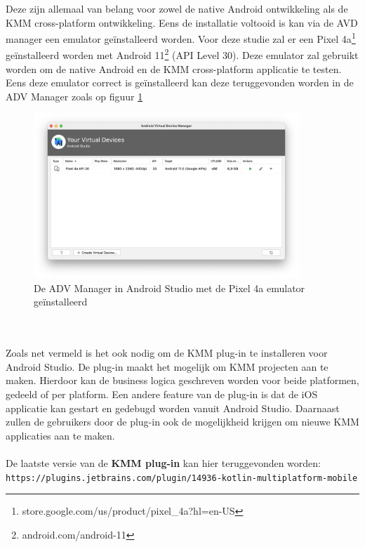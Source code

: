     Deze zijn allemaal van belang voor zowel de native Android ontwikkeling als de KMM cross-platform ontwikkeling. Eens de installatie voltooid is kan via de AVD manager een emulator geïnstalleerd worden. Voor deze studie zal er een Pixel 4a\footnote{store.google.com/us/product/pixel\_4a?hl=en-US} geïnstalleerd worden met Android 11\footnote{android.com/android-11} (API Level 30). Deze emulator zal gebruikt worden om de native Android en de KMM cross-platform applicatie te testen. Eens deze emulator correct is geïnstalleerd kan deze teruggevonden worden in de ADV Manager zoals op figuur \ref{fig:M-as-adv-manager}
    \begin{figure}
        \centering
        \includegraphics[width=10cm]{img/as-adv-manager.png}
        \caption{De ADV Manager in Android Studio met de Pixel 4a emulator geïnstalleerd}
        \label{fig:M-as-adv-manager}
    \end{figure}
    \\ \\
    Zoals net vermeld is het ook nodig om de KMM plug-in te installeren voor Android Studio. De plug-in maakt het mogelijk om KMM projecten aan te maken. Hierdoor kan de business logica geschreven worden voor beide platformen, gedeeld of per platform. Een andere feature van de plug-in is dat de iOS applicatie kan gestart en gedebugd worden vanuit Android Studio. Daarnaast zullen de gebruikers door de plug-in ook de mogelijkheid krijgen om nieuwe KMM applicaties aan te maken.
    \\ \\ 
    De laatste versie van de \textbf{KMM plug-in} kan hier teruggevonden worden:\\
    \verb*|https://plugins.jetbrains.com/plugin/14936-kotlin-multiplatform-mobile|
    
